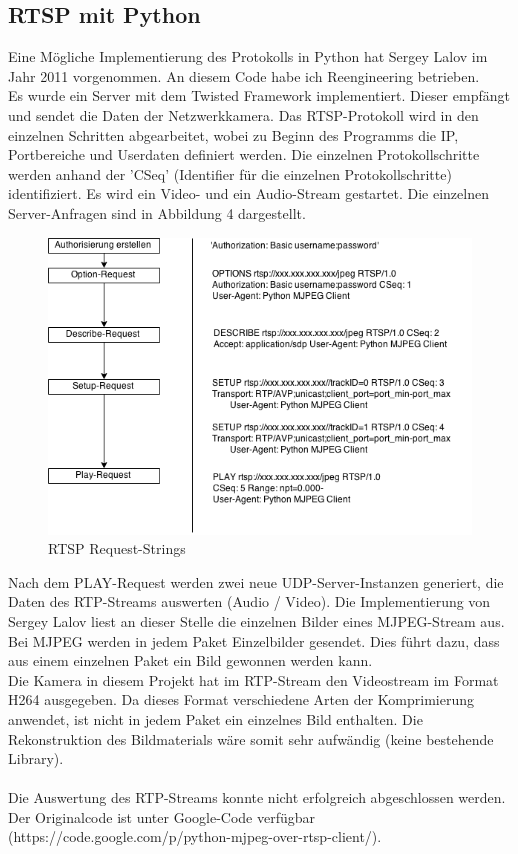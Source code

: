 \subsection{RTSP mit Python}
Eine Mögliche Implementierung des Protokolls in Python hat Sergey Lalov im Jahr 2011 vorgenommen. An diesem Code habe ich Reengineering betrieben. \\
Es wurde ein Server mit dem Twisted Framework implementiert. Dieser empfängt und sendet die Daten der Netzwerkkamera. Das RTSP-Protokoll wird in den einzelnen Schritten abgearbeitet, wobei zu Beginn des Programms die IP, Portbereiche und Userdaten definiert werden. Die einzelnen Protokollschritte werden anhand der 'CSeq' (Identifier für die einzelnen Protokollschritte) identifiziert. Es wird ein Video- und ein Audio-Stream gestartet. Die einzelnen Server-Anfragen sind in Abbildung 4 dargestellt.

\begin{figure}[h]
\begin{minipage}{\textwidth}
	\centering
	\includegraphics[width=\textwidth]{./data/RTSP.png}
	\caption{RTSP Request-Strings}
\end{minipage}
\end{figure}
\pagebreak

Nach dem PLAY-Request werden zwei neue UDP-Server-Instanzen generiert, die Daten des RTP-Streams auswerten (Audio / Video). Die Implementierung von Sergey Lalov liest an dieser Stelle die einzelnen Bilder eines MJPEG-Stream aus. Bei MJPEG werden in jedem Paket Einzelbilder gesendet. Dies führt dazu, dass aus einem einzelnen Paket ein Bild gewonnen werden kann.  \\
Die Kamera in diesem Projekt hat im RTP-Stream den Videostream im Format H264 ausgegeben. Da dieses Format verschiedene Arten der Komprimierung anwendet, ist nicht in jedem Paket ein einzelnes Bild enthalten. Die Rekonstruktion des Bildmaterials wäre somit sehr aufwändig (keine bestehende Library). \\\\
Die Auswertung des RTP-Streams konnte nicht erfolgreich abgeschlossen werden.  Der Originalcode ist unter Google-Code verfügbar (https://code.google.com/p/python-mjpeg-over-rtsp-client/).


